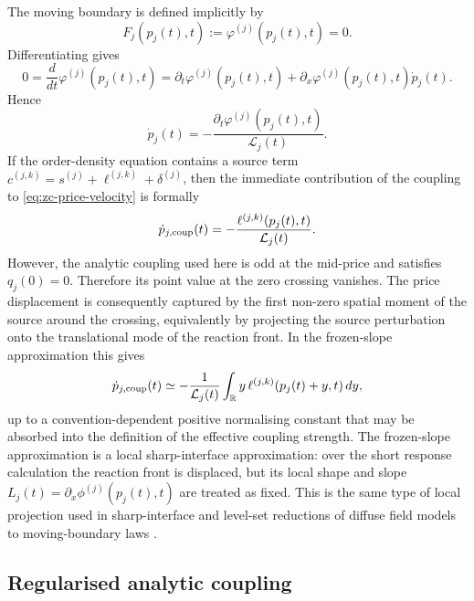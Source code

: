 \documentclass[5p,final]{elsarticle}
\begin{document}
The moving boundary is defined implicitly by
\begin{equation}
F_j(p_j(t),t):=\varphi^{(j)}(p_j(t),t)=0.
\end{equation}
Differentiating gives
\begin{equation}
0=\frac{d}{dt}\varphi^{(j)}(p_j(t),t)
=\partial_t\varphi^{(j)}(p_j(t),t)
+\partial_x\varphi^{(j)}(p_j(t),t)\dot p_j(t).
\end{equation}
Hence
\begin{equation}
\dot p_j(t)
=-\frac{\partial_t\varphi^{(j)}(p_j(t),t)}{\mathcal L_j(t)}.
\label{eq:zc-price-velocity}
\end{equation}
If the order-density equation contains a source term $c^{(j,k)}=s^{(j)}+\ell^{(j,k)}+\delta^{(j)}$, then the immediate contribution of the coupling to \eqref{eq:zc-price-velocity} is formally
\begin{equation}
\dot p_{j,\rm coup}(t)
=-\frac{\ell^{(j,k)}(p_j(t),t)}{\mathcal L_j(t)}.
\end{equation}
However, the analytic coupling used here is odd at the mid-price and satisfies $q_j(0)=0$.  Therefore its point value at the zero crossing vanishes.  The price displacement is consequently captured by the first non-zero spatial moment of the source around the crossing, equivalently by projecting the source perturbation onto the translational mode of the reaction front.  In the frozen-slope approximation this gives
\begin{equation}
\dot p_{j,\rm coup}(t)
\simeq -\frac{1}{\mathcal L_j(t)}
\int_{\mathbb R} y\,\ell^{(j,k)}(p_j(t)+y,t)\,dy,
\label{eq:moment-projection}
\end{equation}
up to a convention-dependent positive normalising constant that may be absorbed into the definition of the effective coupling strength. The frozen-slope approximation is a local sharp-interface approximation: over the short response calculation the reaction front is displaced, but its local shape and slope \(L_j(t)=\partial_x\phi^{(j)}(p_j(t),t)\) are treated as fixed. This is the same type of local projection used in sharp-interface and level-set reductions of diffuse field models to moving-boundary laws \citep{OsherSethian1988Fronts}.

\subsection{Regularised analytic coupling}
\end{document}

